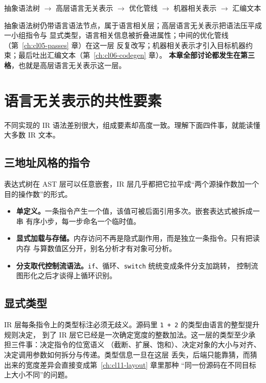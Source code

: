 \documentclass[12pt,a4paper,fontset=fandol]{ctexbook}
\newcommand{\Tp}[1]{\texttt{#1}}
\begin{document}
\begin{flow}[title={从源码到汇编的层次序列}]
抽象语法树 $\rightarrow$ 高层语言无关表示 $\rightarrow$ 优化管线 $\rightarrow$
机器相关表示 $\rightarrow$ 汇编文本
\end{flow}

抽象语法树仍带语言语法节点，属于语言相关层；高层语言无关表示把语法压平成一小组指令与
显式类型，语言相关信息被折叠进属性；中间的优化管线（第~\ref{ch:cl05-passes} 章）在这一层
反复改写；机器相关表示才引入目标机器约束；最后吐出汇编文本（第~\ref{ch:cl06-codegen} 章）。
\textbf{本章全部讨论都发生在第三格}，也就是高层语言无关表示这一层。

\section{语言无关表示的共性要素}\label{sec:cl04-common}

不同实现的 IR 语法差别很大，组成要素却高度一致。理解下面四件事，就能读懂大多数 IR 文本。

\subsection{三地址风格的指令}\label{sec:cl04-three-address}

表达式树在 AST 层可以任意嵌套，IR 层几乎都把它拉平成“两个源操作数加一个目的操作数”的形式。

\begin{itemize}
  \item \textbf{单定义。}一条指令产生一个值，该值可被后面引用多次。嵌套表达式被拆成一串
        有序小步，每一步命名一个临时值。
  \item \textbf{显式加载与存储。}内存访问不再是隐式副作用，而是独立一条指令。只有把读内存
        与算数值区分开，别名分析才有对象可分析。
  \item \textbf{分支取代控制流语法。}\Tp{if}、循环、\Tp{switch} 统统变成条件分支加跳转，
        控制流图形化之后才谈得上循环识别。
\end{itemize}

\subsection{显式类型}\label{sec:cl04-explicit-types}

IR 层每条指令上的类型标注必须无歧义。源码里 \Tp{1 + 2} 的类型由语言的整型提升规则决定，
到了 IR 层它已经是一次确定宽度的整数加法。这一层的类型至少承担三件事：决定指令的位宽语义
（截断、扩展、饱和）、决定对象的大小与对齐、决定调用参数如何拆分与传递。类型信息一旦在这层
丢失，后端只能靠猜，而猜出来的宽度差异会直接变成第~\ref{ch:cl11-layout} 章里那种
“同一份源码在不同目标上大小不同”的问题。
\end{document}
